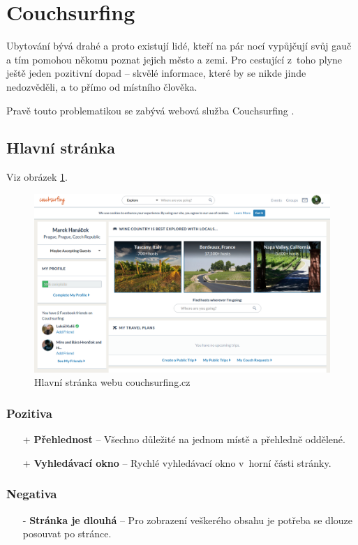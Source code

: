 \section{Couchsurfing}
\label{analyza:couchsurfing}

Ubytování bývá drahé a proto existují lidé, kteří na pár nocí vypůjčují svůj gauč a tím pomohou někomu poznat jejich město a zemi. Pro cestující z~toho plyne ještě jeden pozitivní dopad -- skvělé informace, které by se nikde jinde nedozvěděli, a to přímo od místního člověka.

Pravě touto problematikou se zabývá webová služba Couchsurfing \cite{couchsurfing}.
\subsection{Hlavní stránka}
Viz obrázek \ref{fig:couchsurfing:homepage}.
\begin{figure}[h]
    \centering
    \includegraphics[width=1.0\textwidth]{media/couchsurfing/homepage.png}
    \caption{Hlavní stránka webu couchsurfing.cz}
    \label{fig:couchsurfing:homepage}
\end{figure}
\subsubsection*{Pozitiva}
\begin{itemize}
    \item[+] \textbf{Přehlednost} -- Všechno důležité na jednom místě a přehledně oddělené.
    \item[+] \textbf{Vyhledávací okno} -- Rychlé vyhledávací okno v~horní části stránky.
\end{itemize}
\subsubsection*{Negativa}
\begin{itemize}
    \item[-] \textbf{Stránka je dlouhá} -- Pro zobrazení veškerého obsahu je potřeba se dlouze posouvat po stránce.
\end{itemize}


